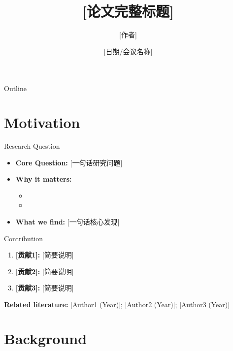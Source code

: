 \documentclass[aspectratio=169,11pt]{beamer}
\title[\shorttitle]{[论文完整标题]}
\author{[作者]}
\institute{[单位]}
\date{[日期/会议名称]}
\begin{document}
\begin{frame}
\titlepage
\end{frame}

\begin{frame}{Outline}
\tableofcontents
\end{frame}


\section{Motivation}

\begin{frame}{Research Question}
\begin{itemize}
    \item \textbf{Core Question:} [一句话研究问题]
    \vspace{1em}
    \item \textbf{Why it matters:}
    \begin{itemize}
        \item [原因1 — 政策/实践意义]
        \item [原因2 — 学术空白]
    \end{itemize}
    \vspace{1em}
    \item \textbf{What we find:} [一句话核心发现]
\end{itemize}
\end{frame}

\begin{frame}{Contribution}
\begin{enumerate}
    \item \textbf{[贡献1]:} [简要说明]
    \item \textbf{[贡献2]:} [简要说明]
    \item \textbf{[贡献3]:} [简要说明]
\end{enumerate}

\vspace{1em}
\textbf{Related literature:} [Author1 (Year)]; [Author2 (Year)]; [Author3 (Year)]
\end{frame}


\section{Background}
\end{document}
